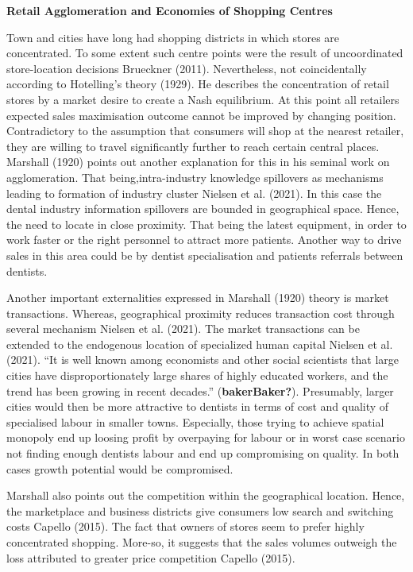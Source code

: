 \documentclass[
  10,
  a4paper,
]{article}
\begin{document}
\textbf{Retail Agglomeration and Economies of Shopping Centres}

Town and cities have long had shopping districts in which stores are
concentrated. To some extent such centre points were the result of
uncoordinated store-location decisions Brueckner (2011). Nevertheless,
not coincidentally according to Hotelling's theory (1929). He describes
the concentration of retail stores by a market desire to create a Nash
equilibrium. At this point all retailers expected sales maximisation
outcome cannot be improved by changing position. Contradictory to the
assumption that consumers will shop at the nearest retailer, they are
willing to travel significantly further to reach certain central places.
Marshall (1920) points out another explanation for this in his seminal
work on agglomeration. That being,intra-industry knowledge spillovers as
mechanisms leading to formation of industry cluster Nielsen et al.
(2021). In this case the dental industry information spillovers are
bounded in geographical space. Hence, the need to locate in close
proximity. That being the latest equipment, in order to work faster or
the right personnel to attract more patients. Another way to drive sales
in this area could be by dentist specialisation and patients referrals
between dentists.

Another important externalities expressed in Marshall (1920) theory is
market transactions. Whereas, geographical proximity reduces transaction
cost through several mechanism Nielsen et al. (2021). The market
transactions can be extended to the endogenous location of specialized
human capital Nielsen et al. (2021). ``It is well known among economists
and other social scientists that large cities have disproportionately
large shares of highly educated workers, and the trend has been growing
in recent decades.'' (\textbf{bakerBaker?}). Presumably, larger cities
would then be more attractive to dentists in terms of cost and quality
of specialised labour in smaller towns. Especially, those trying to
achieve spatial monopoly end up loosing profit by overpaying for labour
or in worst case scenario not finding enough dentists labour and end up
compromising on quality. In both cases growth potential would be
compromised.

Marshall also points out the competition within the geographical
location. Hence, the marketplace and business districts give consumers
low search and switching costs Capello (2015). The fact that owners of
stores seem to prefer highly concentrated shopping. More-so, it suggests
that the sales volumes outweigh the loss attributed to greater price
competition Capello (2015).
\end{document}
